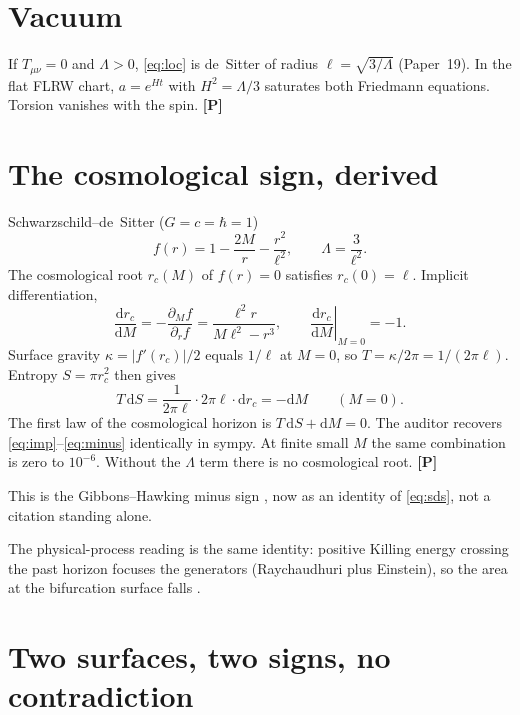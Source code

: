 \documentclass[11pt]{article}
\newcommand{\pP}{\textbf{[P]}}
\begin{document}
\section{Vacuum}

If $T_{\mu\nu}=0$ and $\Lambda>0$, \eqref{eq:loc} is de~Sitter of
radius $\ell=\sqrt{3/\Lambda}$ (Paper~19). In the flat FLRW chart,
$a=e^{Ht}$ with $H^2=\Lambda/3$ saturates both Friedmann equations.
Torsion vanishes with the spin. \pP{}

\section{The cosmological sign, derived}

Schwarzschild--de~Sitter ($G=c=\hbar=1$)
\begin{equation}
f(r)=1-\frac{2M}{r}-\frac{r^2}{\ell^2},
\qquad
\Lambda=\frac{3}{\ell^2}.
\label{eq:sds}
\end{equation}
The cosmological root $r_c(M)$ of $f(r)=0$ satisfies $r_c(0)=\ell$.
Implicit differentiation,
\begin{equation}
\frac{\mathrm{d}r_c}{\mathrm{d}M}
=
-\frac{\partial_M f}{\partial_r f}
=
\frac{\ell^2 r}{M\ell^2-r^3},
\qquad
\left.\frac{\mathrm{d}r_c}{\mathrm{d}M}\right|_{M=0}=-1.
\label{eq:imp}
\end{equation}
Surface gravity $\kappa=\lvert f'(r_c)\rvert/2$ equals $1/\ell$ at
$M=0$, so $T=\kappa/2\pi=1/(2\pi\ell)$. Entropy $S=\pi r_c^2$ then
gives
\begin{equation}
T\,\mathrm{d}S
=
\frac{1}{2\pi\ell}\cdot 2\pi\ell\cdot\mathrm{d}r_c
=
-\mathrm{d}M
\qquad(M=0).
\label{eq:minus}
\end{equation}
The first law of the cosmological horizon is
$T\,\mathrm{d}S+\mathrm{d}M=0$. The auditor recovers
\eqref{eq:imp}--\eqref{eq:minus} identically in sympy. At finite
small $M$ the same combination is zero to $10^{-6}$. Without the
$\Lambda$ term there is no cosmological root. \pP{}

This is the Gibbons--Hawking minus sign
\cite{GibbonsHawking1977,Banihashemi2023}, now as an identity of
\eqref{eq:sds}, not a citation standing alone.

The physical-process reading is the same identity: positive Killing
energy crossing the past horizon focuses the generators
(Raychaudhuri plus Einstein), so the area at the bifurcation surface
falls \cite{Banihashemi2023}.

\section{Two surfaces, two signs, no contradiction}
\end{document}
